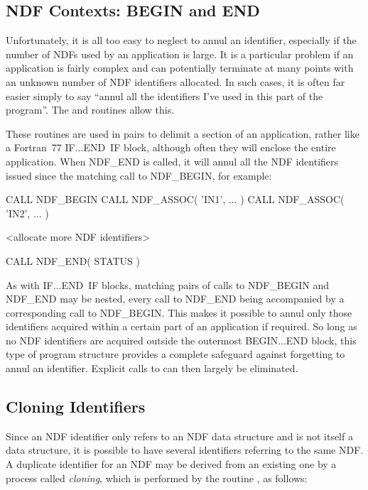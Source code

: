 \documentclass[twoside,11pt,nolof]{starlink}
\providecommand{\st}[1]{{\emph{#1}}}
\begin{document}
\subsection{\label{ss:beginend}NDF Contexts: BEGIN and END}

Unfortunately, it is all too easy to neglect to annul an identifier,  especially
if the number of NDFs used by an application is large.
It is a particular problem if an application is fairly complex and can
potentially terminate at many points with an unknown number of NDF identifiers
allocated.
In such cases, it is often far easier simply to say ``annul all the
identifiers I've used in this part of the program''.
The  and  routines allow this.

These routines are used in pairs to delimit a section of an application, rather
like a Fortran~77 IF...END~IF block, although often they will enclose the
entire application.
When NDF\_END is called, it will annul all the NDF identifiers issued since
the matching call to NDF\_BEGIN, for example:

\small
\begin{terminalv}
      CALL NDF_BEGIN
      CALL NDF_ASSOC( 'IN1', ... )
      CALL NDF_ASSOC( 'IN2', ... )

      <allocate more NDF identifiers>

      CALL NDF_END( STATUS )
\end{terminalv}
\normalsize

As with IF...END~IF blocks, matching pairs of calls to NDF\_BEGIN and NDF\_END
may be nested, every call to NDF\_END being accompanied by a corresponding call
to NDF\_BEGIN.
This makes it possible to annul only those identifiers acquired within a
certain part of an application if required.
So long as no NDF identifiers are acquired outside the outermost BEGIN...END
block, this type of program structure provides a complete safeguard against
forgetting to annul an identifier.
Explicit calls to  can then largely be eliminated.

\subsection{Cloning Identifiers}

Since an NDF identifier only refers to an NDF data structure and is not
itself a data structure, it is possible to have several identifiers
referring to the same NDF.
A duplicate identifier for an NDF may be derived from an existing one by a
process called \st{cloning}, which is performed by the routine , as
follows:
\end{document}
